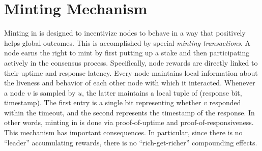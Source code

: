 \documentclass[runningheads]{llncs}
\begin{document}
\section{Minting Mechanism}
Minting in \AVATokenName{} is designed to incentivize nodes to behave in a way that positively helps global outcomes. This is accomplished by special \emph{minting transactions}. A node earns the right to mint by first putting up a stake and then participating actively in the consensus process. 
Specifically, node rewards are directly linked to their uptime and response latency. Every node maintains local information about the liveness and behavior of each other node with which it interacted. Whenever a node $v$ is sampled by $u$, the latter maintains a local tuple of (response bit, timestamp). 
The first entry is a single bit representing whether $v$ responded within the timeout, and the second represents the timestamp of the response. 
In other words, minting in \AVAPlatformName{} is done via proof-of-uptime and proof-of-responsiveness. 
This mechanism has important consequences. In particular, since there is no ``leader'' accumulating rewards, there is no ``rich-get-richer'' compounding effects. 



\end{document}
